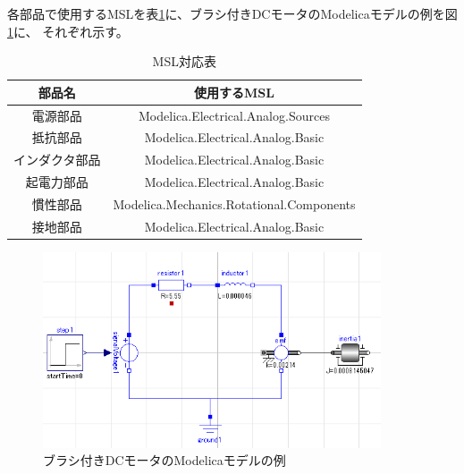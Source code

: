 各部品で使用するMSLを表\ref{tab:MSL}に、ブラシ付きDCモータのModelicaモデルの例を図\ref{fig:tantai_model}に、
それぞれ示す。

\begin{table}[t]
	\centering
	\caption{MSL対応表}
	\begin{tabular}{|c|c|} \hline
	  部品名 & 使用するMSL \\ \hline \hline
	  電源部品 & Modelica.Electrical.Analog.Sources \\ \hline
	  抵抗部品 & Modelica.Electrical.Analog.Basic \\ \hline
	  インダクタ部品 & Modelica.Electrical.Analog.Basic \\ \hline
	  起電力部品 & Modelica.Electrical.Analog.Basic \\ \hline
	  慣性部品 & Modelica.Mechanics.Rotational.Components \\ \hline
	  接地部品 & Modelica.Electrical.Analog.Basic \\ \hline
	\end{tabular}
	\label{tab:MSL}
  \end{table}

\begin{figure}[t]
  \centering
  \includegraphics[width=10cm]{./Image/tantai_model.png}
  \caption{ブラシ付きDCモータのModelicaモデルの例}
  \label{fig:tantai_model}
\end{figure}

  
\clearpage
% 	

